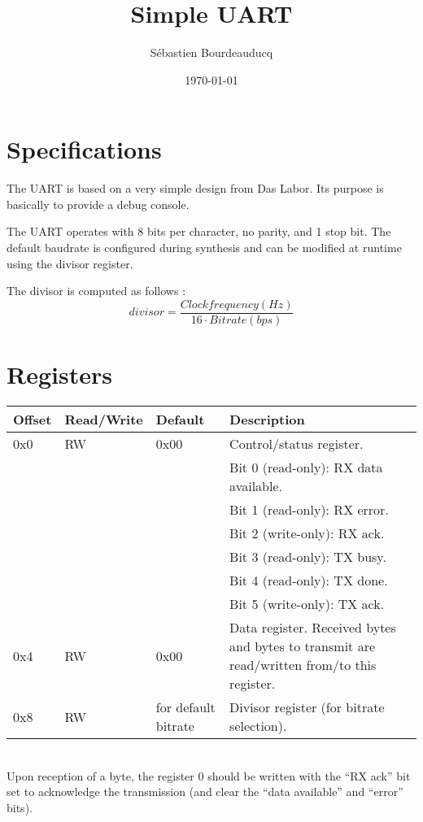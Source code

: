 \documentclass[a4paper,11pt]{article}
\title{Simple UART}
\author{S\'ebastien Bourdeauducq}
\date{\today}
\begin{document}
\setlength{\parindent}{0pt}
\setlength{\parskip}{5pt}
\maketitle{}
\section{Specifications}
The UART is based on a very simple design from Das Labor. Its purpose is basically to provide a debug console.

The UART operates with 8 bits per character, no parity, and 1 stop bit. The default baudrate is configured during synthesis and can be modified at runtime using the divisor register.

The divisor is computed as follows :
\begin{equation*}
divisor = \frac{Clock frequency (Hz)}{16 \cdot Bitrate (bps)}
\end{equation*}

\section{Registers}

\begin{tabularx}{\textwidth}{|l|l|l|X|}
\hline
\bf{Offset} & \bf{Read/Write} & \bf{Default} & \bf{Description} \\
\hline
0x0 & RW & 0x00 & Control/status register.\\
& & & Bit 0 (read-only): RX data available.\\
& & & Bit 1 (read-only): RX error.\\
& & & Bit 2 (write-only): RX ack.\\
& & & Bit 3 (read-only): TX busy.\\
& & & Bit 4 (read-only): TX done.\\
& & & Bit 5 (write-only): TX ack. \\
\hline
0x4 & RW & 0x00 & Data register. Received bytes and bytes to transmit are read/written from/to this register. \\
\hline
0x8 & RW & for default bitrate & Divisor register (for bitrate selection). \\
\hline
\end{tabularx}\\

Upon reception of a byte, the register 0 should be written with the ``RX ack'' bit set to acknowledge the transmission (and clear the ``data available'' and ``error'' bits).
\end{document}
